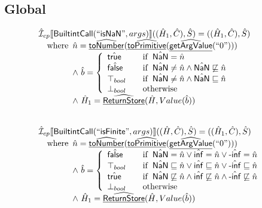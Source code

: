 \documentclass{article}
\newcommand{\SF}[1]{\mbox{\textsf{#1}}}
\newcommand{\wherec}[1]{{\rm where}\begin{array}[t]{l}#1\end{array}}
\newcommand{\ifc}[1]{{\rm if}\begin{array}[t]{l}#1\end{array}}
\newcommand{\owc}{{\rm otherwise}}
\newcommand{\aI}{\hat{\mathcal{I}}}
\newcommand{\lbr}{\llbracket}
\newcommand{\rbr}{\rrbracket}
\newcommand{\ahf}[1]{\widehat{\underline{\sf #1}}}
\newcommand{\atrue}{\hat{\SF{true}}}
\newcommand{\afalse}{\hat{\SF{false}}}
\begin{document}
\subsection{Global}
\[
\begin{array}{l}
\aI _{cp}\lbr \SF{BuiltintCall}(``\SF{isNaN}",args)\rbr((\hat{H}_1,\hat{C}), \hat{S})
  = ((\hat{H}_1, \hat{C}), \hat{S})\\
\quad\wherec{
  \hat{n} = \ahf{toNumber}(\ahf{toPrimitive}(\ahf{getArgValue}(``0")))\\
  \land\ \hat{b} =
    \left\{\begin{array}{l@{\quad\quad}l}
      \atrue & \ifc{\hat{\SF{NaN}} = \hat{n}} \\
      \afalse & \ifc{\hat{\SF{NaN}} \neq \hat{n} \land \hat{\SF{NaN}} \not\sqsubseteq \hat{n}} \\
      \top_{bool} & \ifc{\hat{\SF{NaN}} \neq \hat{n} \land \hat{\SF{NaN}} \sqsubseteq \hat{n}} \\
      \bot_{bool} & \owc \\
    \end{array}\right.\\
  \land\ \hat{H}_1 = \ahf{ReturnStore}(\hat{H}, Value(\hat{b}))\\
  }\\
\\\\


\aI _{cp}\lbr \SF{BuiltintCall}(``\SF{isFinite}",args)\rbr((\hat{H},\hat{C}), \hat{S})
  = ((\hat{H}_1, \hat{C}), \hat{S})\\
\quad\wherec{
  \hat{n} = \ahf{toNumber}(\ahf{toPrimitive}(\ahf{getArgValue}(``0")))\\
  \land\ \hat{b} =
    \left\{\begin{array}{l@{\quad\quad}l}
      \afalse & \ifc{\hat{\SF{NaN}} = \hat{n} \lor \hat{\SF{inf}} = \hat{n} \lor \hat{\SF{-inf}} = \hat{n}}\\
      \top_{bool} & \ifc{\hat{\SF{NaN}} \sqsubseteq \hat{n}
          \lor \hat{\SF{inf}} \sqsubseteq \hat{n} \lor \hat{\SF{-inf}} \sqsubseteq \hat{n}}\\
      \atrue & \ifc{\hat{\SF{NaN}} \not\sqsubseteq \hat{n}
          \land \hat{\SF{inf}} \not\sqsubseteq \hat{n} \land \hat{\SF{-inf}} \not\sqsubseteq \hat{n}} \\
      \bot_{bool} & \owc \\
    \end{array}\right.\\
  \land\ \hat{H}_1 = \ahf{ReturnStore}(\hat{H}, Value(\hat{b}))\\
  }\\
\\\\  

\end{array}
\]
\end{document}
